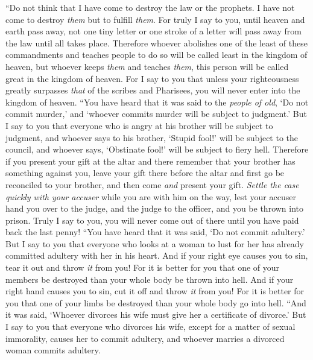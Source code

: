 \begin{biblechapter}
 “Do not think that I have come to destroy the law or the prophets. I have not come to destroy \textit{them} but to fulfill \textit{them}.
\verse For truly I say to you, until heaven and earth pass away, not one tiny letter or one stroke of a letter will pass away from the law until all takes place.
\verse Therefore whoever abolishes one of the least of these commandments and teaches people to do so will be called least in the kingdom of heaven, but whoever keeps \textit{them} and teaches \textit{them}, this person will be called great in the kingdom of heaven.
\verse For I say to you that unless your righteousness greatly surpasses \textit{that} of the scribes and Pharisees, you will never enter into the kingdom of heaven.
 “You have heard that it was said to the \textit{people of old}, ‘Do not commit murder,’ and ‘whoever commits murder will be subject to judgment.’
\verse But I say to you that everyone who is angry at his brother will be subject to judgment, and whoever says to his brother, ‘Stupid fool!’ will be subject to the council, and whoever says, ‘Obstinate fool!’ will be subject to fiery hell.
\verse Therefore if you present your gift at the altar and there remember that your brother has something against you,
\verse leave your gift there before the altar and first go be reconciled to your brother, and then come \textit{and} present your gift.
\verse \textit{Settle the case quickly with your accuser} while you are with him on the way, lest your accuser hand you over to the judge, and the judge to the officer, and you be thrown into prison.
\verse Truly I say to you, you will never come out of there until you have paid back the last penny!
 “You have heard that it was said, ‘Do not commit adultery.’
\verse But I say to you that everyone who looks at a woman to lust for her has already committed adultery with her in his heart.
\verse And if your right eye causes you to sin, tear it out and throw \textit{it} from you! For it is better for you that one of your members be destroyed than your whole body be thrown into hell.
\verse And if your right hand causes you to sin, cut it off and throw \textit{it} from you! For it is better for you that one of your limbs be destroyed than your whole body go into hell.
 “And it was said, ‘Whoever divorces his wife must give her a certificate of divorce.’
\verse But I say to you that everyone who divorces his wife, except for a matter of sexual immorality, causes her to commit adultery, and whoever marries a divorced woman commits adultery.

\end{biblechapter}
